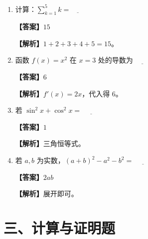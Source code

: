 \documentclass[UTF8,a4paper]{ctexart}
\begin{document}
\begin{enumerate}[leftmargin=2em,itemsep=0.8em]


\item 计算：$\sum_{k=1}^{5} k = \underline{\qquad}$


\par\noindent\textbf{【答案】}$15$
\par\noindent\textbf{【解析】}$1+2+3+4+5=15$。



\item 函数 $f(x)=x^2$ 在 $x=3$ 处的导数为 $\underline{\qquad}$


\par\noindent\textbf{【答案】}$6$
\par\noindent\textbf{【解析】}$f'(x)=2x$，代入得 $6$。



\item 若 $\sin^2 x+\cos^2 x=$ $\underline{\qquad}$


\par\noindent\textbf{【答案】}$1$
\par\noindent\textbf{【解析】}三角恒等式。



\item 若 $a,b$ 为实数，$(a+b)^2-a^2-b^2=$ $\underline{\qquad}$


\par\noindent\textbf{【答案】}$2ab$
\par\noindent\textbf{【解析】}展开即可。


\end{enumerate}
\vspace{1em}


\section*{三、计算与证明题}
\end{document}

